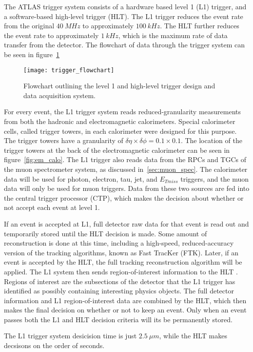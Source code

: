 The ATLAS trigger system consists of a hardware based level 1 (L1) trigger, and a software-based high-level trigger (HLT).
The L1 trigger reduces the event rate from the original $40~MHz$ to approximately $100~kHz$.
The HLT further reduces the event rate to approximately $1~kHz$, which is the maximum rate of data transfer from the detector.
The flowchart of data through the trigger system can be seen in figure~\ref{fig:trigger_flowchart}

\begin{figure}[!htbp]
\texttt{[image: trigger\_flowchart]}
\caption{Flowchart outlining the level 1 and high-level trigger design and data acquisition system.}
\label{fig:trigger_flowchart}
\end{figure}

For every event, the L1 trigger system reads reduced-granularity measurements from both the hadronic and electromagnetic calorimeters.
Special calorimeter cells, called trigger towers, in each calorimeter were designed for this purpose.
The trigger towers have a granularity of $\delta \eta \times \delta \phi = 0.1 \times 0.1$.
The location of the trigger towers at the back of the electromagnetic calorimeter can be seen in figure~\ref{fig:em_calo}.
The L1 trigger also reads data from the RPCs and TGCs of the muon spectrometer system, as discussed in~\ref{sec:muon_spec}.
The calorimeter data will be used for photon, electron, tau, jet, and $E_{Tmiss}$ triggers, and the muon data will only be used for muon triggers.
Data from these two sources are fed into the central trigger processor (CTP),
which makes the decision about whether or not accept each event at level 1.

If an event is accepted at L1, full detector raw data for that event is read out and temporarily stored until the HLT decision is made.
Some amount of reconstruction is done at this time, including a high-speed,
reduced-accuracy version of the tracking algorithms, known as Fast TracKer (FTK).
Later, if an event is accepted by the HLT, the full tracking reconstruction algorithm will be applied.
The L1 system then sends region-of-interest information to the HLT .
Regions of interest are the subsections of the detector that the L1 trigger has identified as possibly containing interesting physics objects.
The full detector information and L1 region-of-interest data are combined by the HLT,
which then makes the final decision on whether or not to keep an event.
Only when an event passes both the L1 and HLT decision criteria will its be permanently stored.

The L1 trigger system desicision time is just $2.5~\mu m$, while the HLT makes decsisons on the order of seconds.